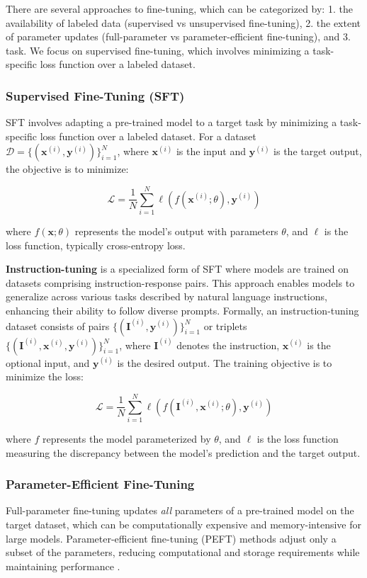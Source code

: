 There are several approaches to fine-tuning, which can be categorized by: 1. the availability of labeled data (supervised vs unsupervised fine-tuning), 2. the extent of parameter updates (full-parameter vs parameter-efficient fine-tuning), and 3. task. We focus on supervised fine-tuning, which involves minimizing a task-specific loss function over a labeled dataset.

\subsubsection{Supervised Fine-Tuning (SFT)}\label{app:sft}

SFT involves adapting a pre-trained model to a target task by minimizing a task-specific loss function over a labeled dataset. For a dataset \( \mathcal{D} = \{(\mathbf{x}^{(i)}, \mathbf{y}^{(i)})\}_{i=1}^N \), where \( \mathbf{x}^{(i)} \) is the input and \( \mathbf{y}^{(i)} \) is the target output, the objective is to minimize:

\[
\mathcal{L} = \frac{1}{N} \sum_{i=1}^N \ell(f(\mathbf{x}^{(i)}; \theta), \mathbf{y}^{(i)})
\]

where \( f(\mathbf{x}; \theta) \) represents the model's output with parameters \( \theta \), and \( \ell \) is the loss function, typically cross-entropy loss.

\textbf{Instruction-tuning} is a specialized form of SFT where models are trained on datasets comprising instruction-response pairs. This approach enables models to generalize across various tasks described by natural language instructions, enhancing their ability to follow diverse prompts. Formally, an instruction-tuning dataset consists of pairs \( \{(\mathbf{I}^{(i)}, \mathbf{y}^{(i)})\}_{i=1}^N \) or triplets \( \{(\mathbf{I}^{(i)}, \mathbf{x}^{(i)}, \mathbf{y}^{(i)})\}_{i=1}^N \), where \( \mathbf{I}^{(i)} \) denotes the instruction, \( \mathbf{x}^{(i)} \) is the optional input, and \( \mathbf{y}^{(i)} \) is the desired output. The training objective is to minimize the loss:

\[
\mathcal{L} = \frac{1}{N} \sum_{i=1}^N \ell(f(\mathbf{I}^{(i)}, \mathbf{x}^{(i)}; \theta), \mathbf{y}^{(i)})
\]

where \( f \) represents the model parameterized by \( \theta \), and \( \ell \) is the loss function measuring the discrepancy between the model's prediction and the target output.

\subsubsection{Parameter-Efficient Fine-Tuning} \label{app:peft}
Full-parameter fine-tuning updates \textit{all} parameters of a pre-trained model on the target dataset, which can be computationally expensive and memory-intensive for large models. Parameter-efficient fine-tuning (PEFT) methods adjust only a subset of the parameters, reducing computational and storage requirements while maintaining performance \citep{XuPARAMETEREFFICIENT2023}.

